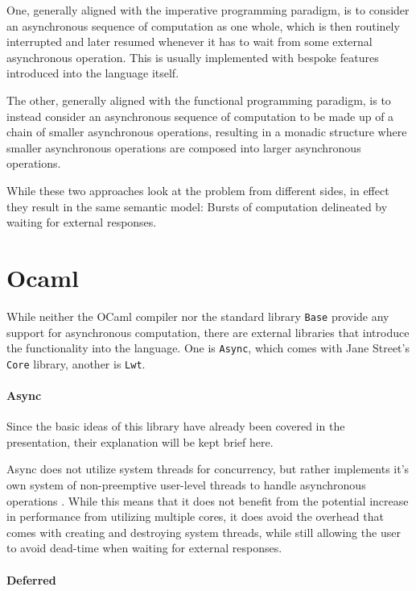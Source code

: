 \documentclass[a4paper,UKenglish,cleveref, autoref, thm-restate]{lipics-v2021}
\begin{document}
One, generally aligned with the imperative programming paradigm, is to consider an asynchronous sequence of computation as one whole, which is then routinely interrupted and later resumed whenever it has to wait from some external asynchronous operation. This is usually implemented with bespoke features introduced into the language itself.

The other, generally aligned with the functional programming paradigm, is to instead consider an asynchronous sequence of computation to be made up of a chain of smaller asynchronous operations, resulting in a monadic structure where smaller asynchronous operations are composed into larger asynchronous operations.

While these two approaches look at the problem from different sides, in effect they result in the same semantic model: Bursts of computation delineated by waiting for external responses.

\section{Ocaml}
\label{sec:ocaml}

While neither the OCaml compiler nor the standard library \verb|Base| provide any support for asynchronous computation, there are external libraries that introduce the functionality into the language. One is \verb|Async|, which comes with Jane Street's \verb|Core| library, another is \verb|Lwt|.

\paragraph*{Async}

Since the basic ideas of this library have already been covered in the presentation, their explanation will be kept brief here.

Async does not utilize system threads for concurrency, but rather implements it's own system of non-preemptive user-level threads to handle asynchronous operations \cite{Concurre6:online}. While this means that it does not benefit from the potential increase in performance from utilizing multiple cores, it does avoid the overhead that comes with creating and destroying system threads, while still allowing the user to avoid dead-time when waiting for external responses.

\paragraph*{Deferred}
\end{document}
